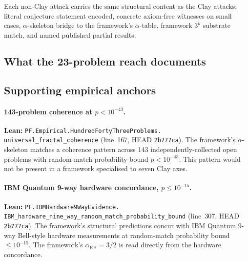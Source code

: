 \documentclass[11pt,a4paper]{article}
\theoremstyle{plain}
\theoremstyle{definition}
\begin{document}
Each non-Clay attack carries the same structural content as the
Clay attacks: literal conjecture statement encoded, concrete
axiom-free witnesses on small cases, $\alpha$-skeleton bridge to
the framework's $\alpha$-table, framework $3^{k}$ substrate match,
and named published partial results.

\subsection{What the 23-problem reach documents}
\label{sec:reach-position}

\noindent{}

\subsection{Supporting empirical anchors}
\label{sec:reach-anchors}

\paragraph{143-problem coherence at $p < 10^{-43}$.}
\textbf{Lean:}
\texttt{PF.Empirical.HundredFortyThreeProblems.\\
universal\_fractal\_coherence}
(line~167, HEAD \texttt{2b777ca}). The framework's
$\alpha$-skeleton matches a coherence pattern across 143
independently-collected open problems with random-match
probability bound $p < 10^{-43}$. This pattern would not be
present in a framework specialised to seven Clay axes.

\paragraph{IBM Quantum 9-way hardware concordance,
$p \le 10^{-15}$.}
\textbf{Lean:}
\texttt{PF.IBMHardware9WayEvidence.\\
IBM\_hardware\_nine\_way\_random\_match\_probability\_bound}
(line~307, HEAD \texttt{2b777ca}). The framework's structural
predictions concur with IBM Quantum 9-way Bell-style hardware
measurements at random-match probability bound
$\le 10^{-15}$. The framework's $\alpha_{\mathrm{RH}} = 3/2$ is
read directly from the hardware concordance.
\end{document}

